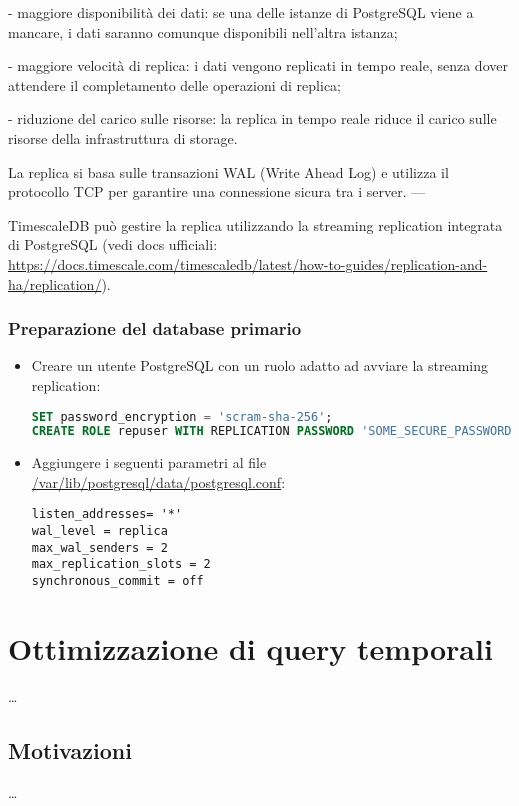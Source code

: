 - maggiore disponibilità dei dati: se una delle istanze di PostgreSQL viene a mancare, i dati saranno comunque disponibili nell'altra istanza;

- maggiore velocità di replica: i dati vengono replicati in tempo reale, senza dover attendere il completamento delle operazioni di replica;

- riduzione del carico sulle risorse: la replica in tempo reale riduce il carico sulle risorse della infrastruttura di storage.

La replica si basa sulle transazioni WAL (Write Ahead Log) e utilizza il protocollo TCP per garantire una connessione sicura tra i server.
---

TimescaleDB può gestire la replica utilizzando la streaming replication integrata di PostgreSQL (vedi docs ufficiali: \url{https://docs.timescale.com/timescaledb/latest/how-to-guides/replication-and-ha/replication/}).

\subsubsection{Preparazione del database primario}

\begin{itemize}
  \item Creare un utente PostgreSQL con un ruolo adatto ad avviare la streaming replication:
   \begin{lstlisting}[language=sql, caption=TODO]
SET password_encryption = 'scram-sha-256'; 
CREATE ROLE repuser WITH REPLICATION PASSWORD 'SOME_SECURE_PASSWORD' LOGIN;\end{lstlisting}
  \item Aggiungere i seguenti parametri al file \url{/var/lib/postgresql/data/postgresql.conf}:
  \begin{lstlisting}[caption=TODO]
listen_addresses= '*'
wal_level = replica
max_wal_senders = 2
max_replication_slots = 2
synchronous_commit = off
\end{lstlisting}
\end{itemize}

\section{Ottimizzazione di query temporali}\label{sec:cont-aggr}
\ldots

\subsection{Motivazioni}\label{ssec:cont-aggr-motivazioni}
\ldots

